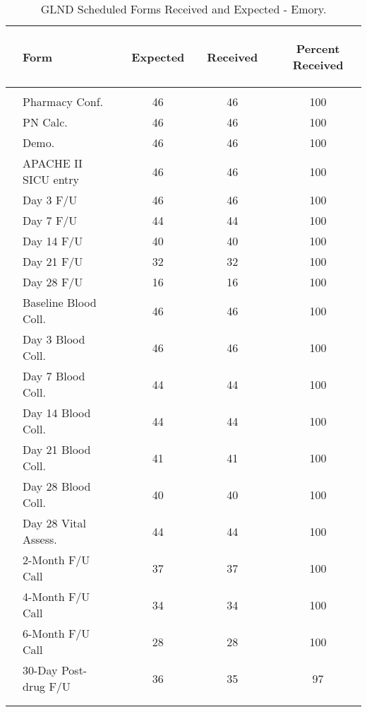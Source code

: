 \documentclass[dvips,10pt]{article}
\begin{document}
\begin{table}[t]
\begin{center}
\begin{tabular}{ @{}l@{}
@{}l@{}@{}p{1.5em}@{}@{}c@{}@{}p{1.5em}@{}@{}l@{}
}
\end{tabular}

\end{center}
 \end{table}
\clearpage
\begin{table}[t]
\caption
{ GLND Scheduled Forms Received and Expected - Emory. }
\begin{center}
\begin{tabular}{ @{}l@{}
@{}l@{}@{}p{1.5em}@{}@{}c@{}@{}p{1.5em}@{}@{}c@{}@{}p{1.5em}@{}@{}c@{}
}
\hline

& \parbox{6em}{\begin{center}Form\end{center}} && \parbox{6em}{\begin{center}Expected\end{center}} && \parbox{6em}{\begin{center}Received\end{center}} && \parbox{6em}{\begin{center}Percent Received\end{center}} \\

\hline

\\
& Pharmacy Conf. && 46 && 46 && 100 \\
& PN Calc. && 46 && 46 && 100 \\
& Demo. && 46 && 46 && 100 \\
& APACHE II SICU entry && 46 && 46 && 100 \\
& Day 3 F/U && 46 && 46 && 100 \\
& Day 7 F/U && 44 && 44 && 100 \\
& Day 14 F/U && 40 && 40 && 100 \\
& Day 21 F/U && 32 && 32 && 100 \\
& Day 28 F/U && 16 && 16 && 100 \\
& Baseline Blood Coll. && 46 && 46 && 100 \\
& Day 3 Blood Coll. && 46 && 46 && 100 \\
& Day 7 Blood Coll. && 44 && 44 && 100 \\
& Day 14 Blood Coll. && 44 && 44 && 100 \\
& Day 21 Blood Coll. && 41 && 41 && 100 \\
& Day 28 Blood Coll. && 40 && 40 && 100 \\
& Day 28 Vital Assess. && 44 && 44 && 100 \\
& 2-Month F/U Call && 37 && 37 && 100 \\
& 4-Month F/U Call && 34 && 34 && 100 \\
& 6-Month F/U Call && 28 && 28 && 100 \\
& 30-Day Post-drug F/U && 36 && 35 && 97 \\
\\
\hline \\

\end{tabular}

\end{center}
 \end{table}
\end{document}
